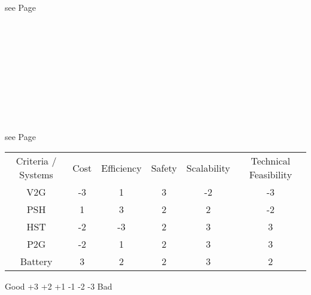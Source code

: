 \begin{parcolumns}[colwidths={1=2.5 cm, 2=10 cm, 3=2.5cm}]{3}
{\begin{tiny}
see Page \pageref{PowertoGas_Christian} \\ \\ \\ \\ \\ \\ \\ \\ \\ \\ \\
see Page \pageref{Batteries} 
\end{tiny}
}
\end{parcolumns}

\begin{table}[h]
\centering 
\begin{tabular}[h]{cccccc}
Criteria / Systems & Cost & Efficiency & Safety & Scalability & Technical Feasibility \\ 
V2G & -3 & 1 & 3 & -2 & -3 \\
PSH & 1 & 3 & 2 & 2 & -2 \\
HST & -2 & -3 & 2 & 3 & 3 \\
P2G & -2 & 1 & 2 & 3 & 3 \\
Battery & 3 & 2 & 2 & 3 & 2 \\
\end{tabular}
\end{table}
\centerline{Good		+3	+2	+1	-1	-2	-3		  Bad}
